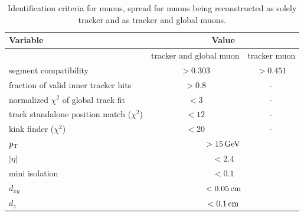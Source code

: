 \begin{table}[h!]
 \centering
 \caption{Identification criteria for muons, spread for muons being reconstructed as solely tracker and as tracker and global muons.}
 \label{tab:muonID}
 \begin{tabular}{lcc}
  Variable                                   & \multicolumn{2}{c}{Value}                     \\\hline
                                             & tracker and global muon        & tracker muon \\\hline
  segment compatibility                      & $>0.303$                       & $>0.451$     \\
  fraction of valid inner tracker hits       & $>0.8$                         & -            \\
  normalized $\chi^2$ of global track fit    & $<3$                           & -            \\
  track standalone position match ($\chi^2$) & $<12$                          & -            \\
  kink finder ($\chi^2$)                     & $<20$                          & -            \\\hline
  $p_{\mathrm{T}}$                                      & \multicolumn{2}{c}{$>15\,\text{Ge\hspace{-.08em}V}$}                 \\
  $|\eta|$                                   & \multicolumn{2}{c}{$<2.4$}                    \\
  mini isolation                             & \multicolumn{2}{c}{$<0.1$}                    \\
  $d_{xy}$                                   & \multicolumn{2}{c}{$<0.05\,\text{cm}$}                \\
  $d_z$                                      & \multicolumn{2}{c}{$<0.1\,\text{cm}$}                 \\\hline
 \end{tabular}
\end{table}

